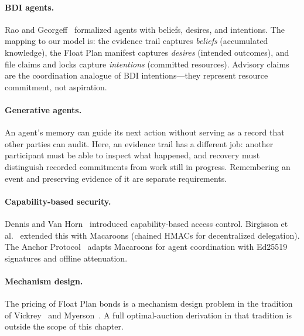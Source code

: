\documentclass[11pt,a4paper]{article}
\theoremstyle{definition}
\theoremstyle{remark}
\begin{document}
\paragraph{BDI agents.} Rao and Georgeff~ formalized agents with beliefs, desires, and intentions. The mapping to our model is: the evidence trail captures \emph{beliefs} (accumulated knowledge), the Float Plan manifest captures \emph{desires} (intended outcomes), and file claims and locks capture \emph{intentions} (committed resources). Advisory claims are the coordination analogue of BDI intentions---they represent resource commitment, not aspiration.

\paragraph{Generative agents.} An agent's memory can guide its next action
without serving as a record that other parties can audit.
Here, an evidence trail has a different job: another participant must be able
to inspect what happened, and recovery must distinguish recorded commitments
from work still in progress. Remembering an event and preserving evidence of
it are separate requirements.

\paragraph{Capability-based security.} Dennis and Van Horn~ introduced capability-based access control. Birgisson et al.~ extended this with Macaroons (chained HMACs for decentralized delegation). The Anchor Protocol~ adapts Macaroons for agent coordination with Ed25519 signatures and offline attenuation.

\paragraph{Mechanism design.} The pricing of Float Plan bonds is a mechanism design problem in the tradition of Vickrey~ and Myerson~. A full optimal-auction derivation in that tradition is outside the scope of this chapter.
\end{document}

